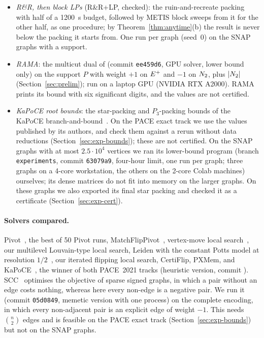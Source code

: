 \begin{itemize}
Section~\ref{sec:exp-time}), and, on a subset of PACE instances, with a long
budget and one block covering the graph.
\item \emph{R\&R, then block LPs} (R\&R+LP, checked): the ruin-and-recreate
packing with half of a \SI{1200}{s} budget, followed by METIS block sweeps
from it for the other half, as one procedure; by
Theorem~\ref{thm:anytime}(b) the result is never below the packing it starts
from.  One run per graph (seed~0) on the SNAP graphs with a support.
\item \emph{RAMA}: the multicut dual of \citet{AbbasS22rama} (commit
\texttt{ee459d6}, GPU solver, lower bound only) on the support $P$ with weight
$+1$ on $E^{+}$ and $-1$ on $N_{2}$, plus $|N_{2}|$ (Section~\ref{sec:prelim});
run on a laptop GPU (NVIDIA RTX A2000).  RAMA prints its bound with six
significant digits, and the values are not certified.
\item \emph{KaPoCE root bounds}: the star-packing and $P_3$-packing bounds of
the KaPoCE branch-and-bound~\cite{BlasiusEtAl22sea}.  On the PACE exact track
we use the values published by its authors, and check them against a rerun
without data reductions (Section~\ref{sec:exp-bounds}); these are not
certified.  On the SNAP graphs with at most
$2.5\cdot10^4$ vertices we ran its lower-bound program (branch \texttt{experiments}, commit
\texttt{63079a9}, four-hour limit, one run per graph; three graphs on a
4-core workstation, the others on the 2-core Colab machines) ourselves; its
dense matrices do not fit into memory on the larger graphs.  On these graphs
we also exported its final star packing and checked it as a certificate
(Section~\ref{sec:exp-cert}).
\end{itemize}

\paragraph{Solvers compared.}  Pivot~\cite{AilonCN08}, the best of 50
Pivot runs, MatchFlipPivot~\cite{veldt2022stc}, vertex-move local
search~\cite{elsner2009bounding}, our multilevel Louvain-type local search,
Leiden with the constant Potts model at resolution
$1/2$~\cite{TraagWvE19,veldt2018lambdacc}, our iterated flipping local search,
CertiFlip, PXMem, and KaPoCE~\cite{BlasiusEtAl21kapoceHeur}, the winner of both
PACE~2021 tracks (heuristic version, commit \texttt{\numKapoceCommit}).  SCC~\cite{hausberger2025scc}
optimises the objective of sparse signed graphs, in which a pair without an
edge costs nothing, whereas here every non-edge is a negative pair.  We run it
(commit \texttt{05d0849}, memetic version with one process) on the complete
encoding, in which every non-adjacent pair is an explicit edge of weight
$-1$.  This needs $\binom n2$ edges and is feasible on the PACE exact track
(Section~\ref{sec:exp-bounds}) but not on the SNAP graphs.

